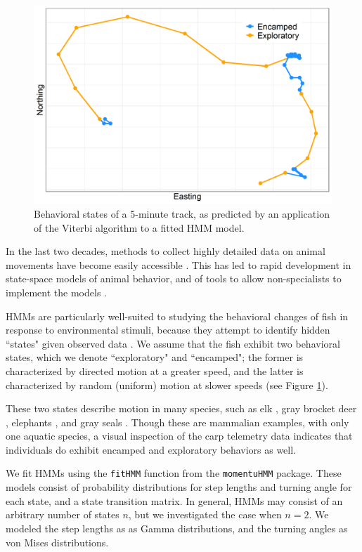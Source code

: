 \documentclass[12pt]{article}
\begin{document}
	\begin{figure}
		\includegraphics[width=\textwidth]{track_states.png}
		\caption{Behavioral states of a 5-minute track, as predicted by an application of the Viterbi algorithm to a fitted HMM model.}
		\label{img:track_states}
	\end{figure}
	
	In the last two decades, methods to collect highly detailed data on animal movements have become easily accessible \cite{McConnell2010, Tomkiewicz2010}. This has led to rapid development in state-space models of animal behavior, and of tools to allow non-specialists to implement the models \cite{Johnson2008, McClintock2012, Michelot2016, Whoriskey2017, McClintock2018}.
	
	HMMs are particularly well-suited to studying the behavioral changes of fish in response to environmental stimuli, because they attempt to identify hidden ``states" given observed data \cite{Rabiner1989}. We assume that the fish exhibit two behavioral states, which we denote ``exploratory" and ``encamped"; the former is characterized by directed motion at a greater speed, and the latter is characterized by random (uniform) motion at slower speeds (see Figure \ref{img:track_states}).
	
	These two states describe motion in many species, such as elk \cite{Morales2004, Fryxell2008}, gray brocket deer \cite{Grotta-Neto2019}, elephants \cite{Roever2014, Vogel2019}, and gray seals \cite{Breed2009}. Though these are mammalian examples, with only one aquatic species, a visual inspection of the carp telemetry data indicates that individuals do exhibit encamped and exploratory behaviors as well.
	
	We fit HMMs using the \texttt{fitHMM} function from the \texttt{momentuHMM} package. These models consist of probability distributions for step lengths and turning angle for each state, and a state transition matrix. In general, HMMs may consist of an arbitrary number of states $n$, but we investigated the case when $n = 2$. We modeled the step lengths as as Gamma distributions, and the turning angles as von Mises distributions.
	
\end{document}
